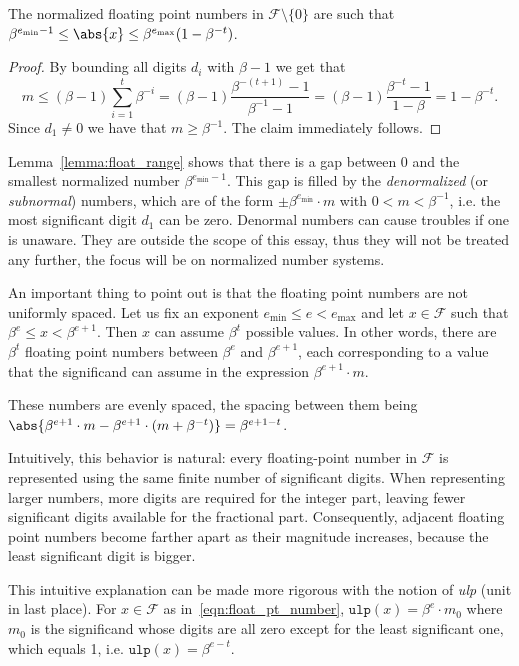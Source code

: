 \begin{lemma}\label{lemma:float_range}
	The normalized floating point numbers in $\mathcal{F}\setminus\{0\}$ are such that $\beta^{e_{\min}-1}\le\abs{x}\le\beta^{e_{\max}}(1-\beta^{-t})$.
\end{lemma}
\begin{proof}
	By bounding all digits $d_i$ with $\beta-1$ we get that 
	\[
		m\le(\beta-1)\sum_{i=1}^t\beta^{-i}=(\beta-1)\frac{\beta^{-(t+1)}-1}{\beta^{-1}-1}=(\beta-1)\frac{\beta^{-t}-1}{1-\beta}=1-\beta^{-t}.
	\]
	Since $d_1\ne 0$ we have that $m\ge\beta^{-1}$. The claim immediately follows.
\end{proof}
Lemma~\ref{lemma:float_range} shows that there is a gap between $0$ and the smallest normalized number $\beta^{e_{\min}-1}$. This gap is filled by the \emph{denormalized} (or \emph{subnormal}) numbers, which are of the form $\pm\beta^{e_{\min}}\cdot m$ with $0<m<\beta^{-1}$, i.e. the most significant digit $d_1$ can be zero. %
Denormal numbers can cause troubles if one is unaware. They are outside the scope of this essay, thus they will not be treated any further, the focus will be on normalized number systems.
\smallskip 

\noindent An important thing to point out is that the floating point numbers are not uniformly spaced. Let us fix an exponent $e_{\min}\le e<e_{\max}$ and let $x\in\mathcal{F}$ such that $\beta^e\le x<\beta^{e+1}$. Then $x$ can assume $\beta^t$ possible values. In other words, there are $\beta^t$ floating point numbers between $\beta^e$ and $\beta^{e+1}$, each corresponding to a value that the significand can assume in the expression $\beta^{e+1}\cdot m$. 

These numbers are evenly spaced, the spacing between them being $\abs{\beta^{e+1}\cdot m - \beta^{e+1}\cdot(m+\beta^{-t})}=\beta^{e+1-t}$.

\begin{oss*}
	Intuitively, this behavior is natural: every floating-point number in $\mathcal{F}$ is represented using the same finite number of significant digits. When representing larger numbers, more digits are required for the integer part, leaving fewer significant digits available for the fractional part. Consequently, adjacent floating point numbers become farther apart as their magnitude increases, because the least significant digit is bigger.
	
	This intuitive explanation can be made more rigorous with the notion of \emph{ulp} (unit in last place). For $x\in\mathcal{F}$ as in~\eqref{eqn:float_pt_number}, $\mathtt{ulp}(x)=\beta^e\cdot m_0$ where $m_0$ is the significand whose digits are all zero except for the least significant one, which equals 1, i.e. $\mathtt{ulp}(x)=\beta^{e-t}$.
\end{oss*}

